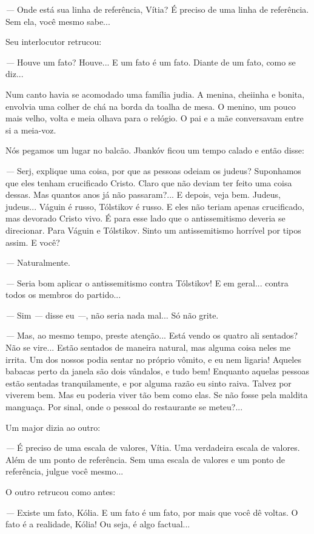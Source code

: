 \emph{---} Onde está sua linha de referência, Vítia? É preciso de uma
linha de referência. Sem ela, você mesmo sabe...

Seu interlocutor retrucou:

\emph{---} Houve um fato? Houve... E um fato é um fato. Diante de um
fato, como se diz...

Num canto havia se acomodado uma família judia. A menina, cheiinha e
bonita, envolvia uma colher de chá na borda da toalha de mesa. O menino,
um pouco mais velho, volta e meia olhava para o relógio. O pai e a mãe
conversavam entre si a meia-voz.

Nós pegamos um lugar no balcão. Jbankóv ficou um tempo calado e então
disse:

\emph{---} Serj, explique uma coisa, por que as pessoas odeiam os
judeus? Suponhamos que eles tenham crucificado Cristo. Claro que não
deviam ter feito uma coisa dessas. Mas quantos anos já não passaram?...
E depois, veja bem. Judeus, judeus... Váguin é russo, Tólstikov é russo.
E eles não teriam apenas crucificado, mas devorado Cristo vivo. É para
esse lado que o antissemitismo deveria se direcionar. Para Váguin e
Tólstikov. Sinto um antissemitismo horrível por tipos assim. E você?

\emph{---} Naturalmente.

\emph{---} Seria bom aplicar o antissemitismo contra Tólstikov! E em
geral... contra todos os membros do partido...

\emph{---} Sim \emph{---} disse eu \emph{---}, não seria nada mal... Só
não grite.

\emph{---} Mas, ao mesmo tempo, preste atenção... Está vendo os quatro
ali sentados? Não se vire... Estão sentados de maneira natural, mas
alguma coisa neles me irrita. Um dos nossos podia sentar no próprio
vômito, e eu nem ligaria! Aqueles babacas perto da janela são dois
vândalos, e tudo bem! Enquanto aquelas pessoas estão sentadas
tranquilamente, e por alguma razão eu sinto raiva. Talvez por viverem
bem. Mas eu poderia viver tão bem como elas. Se não fosse pela maldita
manguaça. Por sinal, onde o pessoal do restaurante se meteu?...

Um major dizia ao outro:

\emph{---} É preciso de uma escala de valores, Vítia. Uma verdadeira
escala de valores. Além de um ponto de referência. Sem uma escala de
valores e um ponto de referência, julgue você mesmo...

O outro retrucou como antes:

\emph{---} Existe um fato, Kólia. E um fato é um fato, por mais que você
dê voltas. O fato é a realidade, Kólia! Ou seja, é algo factual...

